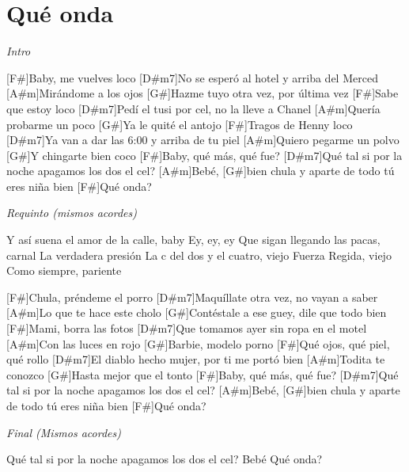 \section{Qu\'e onda}

\noindent
\vspace{1cm}

\begin{guitar}
	\begin{multicols}{2}

	\textit{Intro}

	[F#]Baby, me vuelves loco
	[D#m7]No se esper\'o al hotel y arriba del Merced
	[A#m]Mir\'andome a los ojos
	[G#]Hazme tuyo otra vez, por \'ultima vez
	[F#]Sabe que estoy loco
	[D#m7]Ped\'i el tusi por cel, no la lleve a Chanel
	[A#m]Quer\'ia probarme un poco
	[G#]Ya le quit\'e el antojo
	[F#]Tragos de Henny loco
	[D#m7]Ya van a dar las 6:00 y arriba de tu piel
	[A#m]Quiero pegarme un polvo
	[G#]Y chingarte bien coco
	[F#]Baby, qu\'e m\'as, qué fue?
	[D#m7]Qu\'e tal si por la noche apagamos los dos el cel?
	[A#m]Beb\'e, [G#]bien chula y aparte de todo t\'u eres ni\~{n}a bien
	[F#]Qu\'e onda?


	\textit{Requinto (mismos acordes)}

	Y as\'i suena el amor de la calle, baby
	Ey, ey, ey
	Que sigan llegando las pacas, carnal
	La verdadera presi\'on
	La c del dos y el cuatro, viejo
	Fuerza Regida, viejo
	Como siempre, pariente


	[F#]Chula, pr\'endeme el porro
	[D#m7]Maqu\'illate otra vez, no vayan a saber
	[A#m]Lo que te hace este cholo
	[G#]Cont\'estale a ese guey, dile que todo bien
	[F#]Mami, borra las fotos
	[D#m7]Que tomamos ayer sin ropa en el motel
	[A#m]Con las luces en rojo
	[G#]Barbie, modelo porno
	[F#]Qu\'e ojos, qu\'e piel, qu\'e rollo
	[D#m7]El diablo hecho mujer, por ti me port\'o bien
	[A#m]Todita te conozco
	[G#]Hasta mejor que el tonto
	[F#]Baby, qu\'e m\'as, qué fue?
	[D#m7]Qu\'e tal si por la noche apagamos los dos el cel?
	[A#m]Beb\'e, [G#]bien chula y aparte de todo t\'u eres niña bien
	[F#]Qu\'e onda?


	\textit{Final (Mismos acordes)}

	Qu\'e tal si por la noche apagamos los dos el cel?
	Beb\'e
	Qu\'e onda?

	\end{multicols}
\end{guitar}
